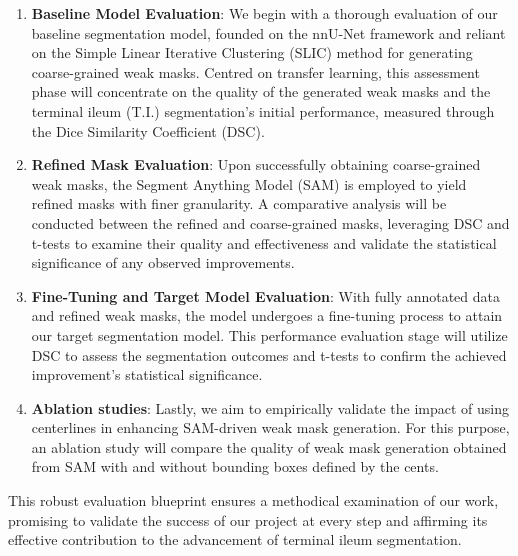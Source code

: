 \begin{enumerate}
    \item \textbf{Baseline Model Evaluation}: We begin with a thorough evaluation of our baseline segmentation model, founded on the nnU-Net framework and reliant on the Simple Linear Iterative Clustering (SLIC) method for generating coarse-grained weak masks. Centred on transfer learning, this assessment phase will concentrate on the quality of the generated weak masks and the terminal ileum (T.I.) segmentation's initial performance, measured through the Dice Similarity Coefficient (DSC).
    \item \textbf{Refined Mask Evaluation}: Upon successfully obtaining coarse-grained weak masks, the Segment Anything Model (SAM) is employed to yield refined masks with finer granularity. A comparative analysis will be conducted between the refined and coarse-grained masks, leveraging DSC and t-tests to examine their quality and effectiveness and validate the statistical significance of any observed improvements.
    \item \textbf{Fine-Tuning and Target Model Evaluation}: With fully annotated data and refined weak masks, the model undergoes a fine-tuning process to attain our target segmentation model. This performance evaluation stage will utilize DSC to assess the segmentation outcomes and t-tests to confirm the achieved improvement's statistical significance.
    \item \textbf{Ablation studies}: Lastly, we aim to empirically validate the impact of using centerlines in enhancing SAM-driven weak mask generation. For this purpose, an ablation study will compare the quality of weak mask generation obtained from SAM with and without bounding boxes defined by the cents.
\end{enumerate}
This robust evaluation blueprint ensures a methodical examination of our work, promising to validate the success of our project at every step and affirming its effective contribution to the advancement of terminal ileum segmentation.